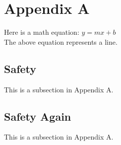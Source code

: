 \clearpage
\section{Appendix A} \label{appendixA}

Here is a math equation: $y = mx + b$\\
The above equation represents a line.

\subsection{Safety} \label{safety}
This is a subsection in Appendix A.

\subsection{Safety Again} \label{safetyagain}
This is a subsection in Appendix A.

